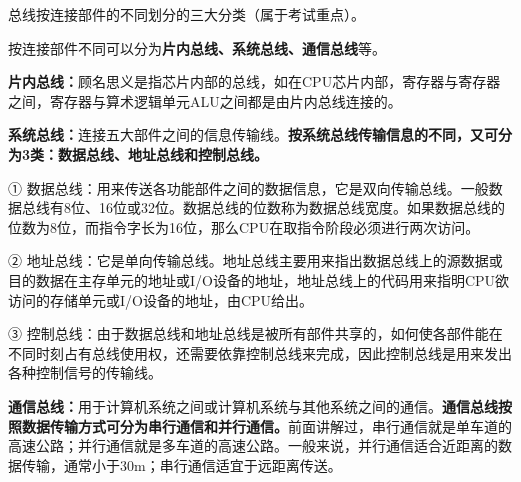总线按连接部件的不同划分的三大分类（{属于考试重点}）。

按连接部件不同可以分为\textbf{片内总线、系统总线、通信总线}等。

\textbf{片内总线：}顾名思义是指芯片内部的总线，如在CPU芯片内部，寄存器与寄存器之间，寄存器与算术逻辑单元ALU之间都是由片内总线连接的。

\textbf{系统总线：}连接五大部件之间的信息传输线。\textbf{按系统总线传输信息的不同，又可分为3类：数据总线、地址总线和控制总线。}

①
数据总线：用来传送各功能部件之间的数据信息，它是双向传输总线。一般数据总线有8位、16位或32位。数据总线的位数称为数据总线宽度。如果数据总线的位数为8位，而指令字长为16位，那么CPU在取指令阶段必须进行两次访问。

②
地址总线：它是单向传输总线。地址总线主要用来指出数据总线上的源数据或目的数据在主存单元的地址或I/O设备的地址，地址总线上的代码用来指明CPU欲访问的存储单元或I/O设备的地址，由CPU给出。

③
控制总线：由于数据总线和地址总线是被所有部件共享的，如何使各部件能在不同时刻占有总线使用权，还需要依靠控制总线来完成，因此控制总线是用来发出各种控制信号的传输线。

\textbf{通信总线：}用于计算机系统之间或计算机系统与其他系统之间的通信。\textbf{通信总线按照数据传输方式可分为串行通信和并行通信。}前面讲解过，串行通信就是单车道的高速公路；并行通信就是多车道的高速公路。一般来说，并行通信适合近距离的数据传输，通常小于30m；串行通信适宜于远距离传送。
